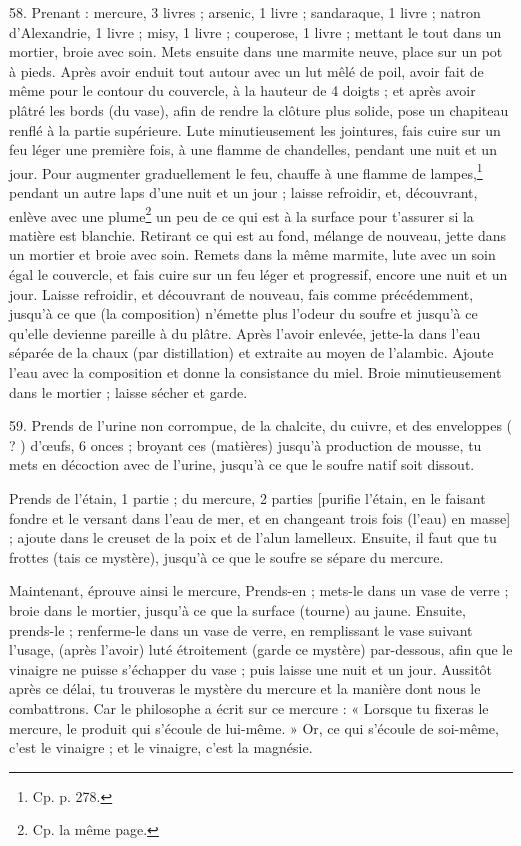 \documentclass[a4paper, 11pt, oneside, polutonikogreek, french]{article}
\begin{document}
58. Prenant : mercure, 3 livres ; arsenic, 1 livre ; sandaraque, 1 livre ; natron d'Alexandrie, 1 livre ; misy, 1 livre ; couperose, 1 livre ; mettant le tout dans un mortier, broie avec soin. Mets ensuite dans une marmite neuve, place sur un pot à pieds. Après avoir enduit tout autour avec un lut mêlé de poil, avoir fait de même pour le contour du couvercle, à la hauteur de 4 doigts ; et après avoir plâtré les bords (du vase), afin de rendre la clôture plus solide, pose un chapiteau renflé à la partie supérieure. Lute minutieusement les jointures, fais cuire sur un feu léger une première fois, à une flamme de chandelles, pendant une nuit et un jour. Pour augmenter graduellement le feu, chauffe à une flamme de lampes,\footnote{Cp. p. 278.} pendant un autre laps d'une nuit et un jour ; laisse refroidir, et, découvrant, enlève avec une plume\footnote{Cp. la même page.} un peu de ce qui est à la surface pour t'assurer si la matière est blanchie. Retirant ce qui est au fond, mélange de nouveau, jette dans un mortier et broie avec soin. Remets dans la même marmite, lute avec un soin égal le couvercle, et fais cuire sur un feu léger et progressif, encore une nuit et un jour. Laisse refroidir, et découvrant de nouveau, fais comme précédemment, jusqu'à ce que (la composition) n'émette plus l'odeur du soufre et jusqu'à ce qu'elle devienne pareille à du plâtre. Après l'avoir enlevée, jette-la dans l'eau séparée de la chaux (par distillation) et extraite au moyen de l'alambic. Ajoute l'eau avec la composition et donne la consistance du miel. Broie minutieusement dans le mortier ; laisse sécher et garde.

59. Prends de l'urine non corrompue, de la chalcite, du cuivre, et des enveloppes ( ? ) d'œufs, 6 onces ; broyant ces (matières) jusqu'à production de mousse, tu mets en décoction avec de l'urine, jusqu'à ce que le soufre natif soit dissout.

Prends de l'étain, 1 partie ; du mercure, 2 parties [purifie l'étain, en le faisant fondre et le versant dans l'eau de mer, et en changeant trois fois (l'eau) en masse] ; ajoute dans le creuset de la poix et de l'alun lamelleux. Ensuite, il faut que tu frottes (tais ce mystère), jusqu'à ce que le soufre se sépare du mercure.

Maintenant, éprouve ainsi le mercure, Prends-en ; mets-le dans un vase de verre ; broie dans le mortier, jusqu'à ce que la surface (tourne) au jaune. Ensuite, prends-le ; renferme-le dans un vase de verre, en remplissant le vase suivant l'usage, (après l'avoir) luté étroitement (garde ce mystère) par-dessous, afin que le vinaigre ne puisse s'échapper du vase ; puis laisse une nuit et un jour. Aussitôt après ce délai, tu trouveras le mystère du mercure et la manière dont nous le combattrons. Car le philosophe a écrit sur ce mercure : « Lorsque tu fixeras le mercure, le produit qui s'écoule de lui-même. » Or, ce qui s'écoule de soi-même, c'est le vinaigre ; et le vinaigre, c'est la magnésie.
\end{document}
